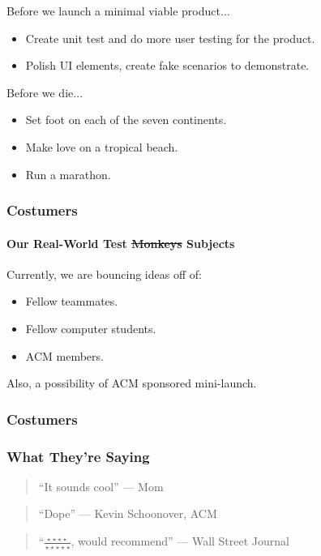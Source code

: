 \documentclass[handout,xclolor=dvipsnames]{beamer}    %
\begin{document}
\begin{darkframes}
\begin{frame}
        Before we launch a minimal viable product$\ldots$
        \begin{itemize}
            \item Create unit test and do more user testing for the product.
            \item Polish UI elements, create fake scenarios to demonstrate.
        \end{itemize}\pause{}

        Before we die$\ldots$
        \begin{itemize}
            \item Set foot on each of the seven continents.
            \item Make love on a tropical beach.
            \item Run a marathon.
        \end{itemize}
    \end{frame}




    \begin{frame}
        \frametitle{Costumers}
        \framesubtitle{Our Real-World Test \st{Monkeys} Subjects}

        Currently, we are bouncing ideas off of:
        \begin{itemize}
            \item Fellow teammates.
            \item Fellow computer students.
            \item ACM members.
        \end{itemize}

        Also, a possibility of ACM sponsored mini-launch.
    \end{frame}


    \begin{frame}
        \frametitle{Costumers}
        \frametitle{What They're Saying}

        \begin{quote}
            ``It sounds cool'' --- Mom\pause{}
        \end{quote}

        \begin{quote}
            ``Dope'' --- Kevin Schoonover, ACM\pause{}
        \end{quote}

        \begin{quote}
            ``$\frac{\star\star\star\star}{\star\star\star\star\star}$, would recommend'' --- Wall Street Journal\pause{}
        \end{quote}


\end{frame}
\end{darkframes}
\end{document}
